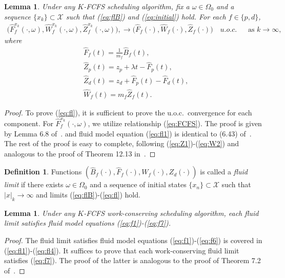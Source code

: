 \documentclass[11pt]{article}
\theoremstyle{plain}
\newtheorem{lemma}[theorem]{Lemma}
\theoremstyle{definition}
\newtheorem{definition}[theorem]{Definition}
\theoremstyle{remark}
\providecommand{\abs}[1]{\lvert#1\rvert}
\begin{document}
\begin{lemma}
  Under any $K$-FCFS scheduling algorithm, fix
  a $\omega\in \Omega_0$ and a sequence  $\{x_k\}\subset \mathcal{X}$ such that
  (\ref{eq:flB}) and (\ref{eq:initial}) hold. For each $f\in \{p, d\}$,
  \begin{align}\label{eq:fl}
    \Big(\hat F^{x_k}_f(\cdot, \omega), \hat W^{x_k}_f(\cdot, \omega),
    \hat Z^{x_k}_f(\cdot, \omega)\Big), 
    \to \Big(\hat F_f(\cdot), \hat W_f(\cdot), \hat Z_f(\cdot)\Big) \quad u.o.c.\ \quad
    \text{ as } k\to\infty,
  \end{align}
  where
  \begin{align}
    & \hat F_f(t) = \frac{1}{m_f}\hat B_f(t),\label{eq:fl1}\\
    & \hat Z_p(t)=z_p + \lambda t -\hat F_p(t), \label{eq:fl2}\\
    & \hat Z_d(t)=z_d +\hat F_p(t) - \hat F_d(t),\label{eq:fl3} \\
    & \hat W_f(t) = m_f\hat Z_f(t).\label{eq:fl4}
  \end{align}
\end{lemma}
\begin{proof}
  To prove (\ref{eq:fl}), it is sufficient to prove the u.o.c.\ convergence for each component. For $\hat F_f^{x_k}(\cdot, \omega)$, we utilize relationship (\ref{eq:FCFS}). The proof is given by Lemma 6.8 of~\citep{dai2020processing}. and fluid model equation (\ref{eq:fl1}) is identical to (6.43) of~\citep{dai2020processing}. The rest of the proof is easy to complete, following (\ref{eq:Z1})-(\ref{eq:W2}) and analogous to the proof of Theorem 12.13 in~\citep{dai2020processing}.
\end{proof}

\begin{definition} \label{def:fl}
  Functions $(\hat B_f(\cdot), \hat F_f(\cdot), W_f(\cdot), Z_d(\cdot))$ is called a \textit{fluid limit} if there exists $\omega\in \Omega_0$ and a sequence of initial states  $\{x_n\}\subset \mathcal{X}$ such that $\abs{x}_k\to\infty$ and limits (\ref{eq:flB})-(\ref{eq:fl}) hold.
\end{definition}

\begin{lemma}\label{lem:fl}
Under any $K$-FCFS work-conserving scheduling algorithm, each fluid limit satisfies fluid model equations (\ref{eq:f1})-(\ref{eq:f7}).
\end{lemma}
\begin{proof}
  The fluid limit satisfies fluid model equations (\ref{eq:f1})-(\ref{eq:f6}) is covered in (\ref{eq:fl1})-(\ref{eq:fl4}). It suffices to prove that each work-conserving fluid limit satisfies (\ref{eq:f7}). The proof of the latter is analogous to the proof of Theorem 7.2 of~\citep{dai2020processing}.
\end{proof}
\end{document}
